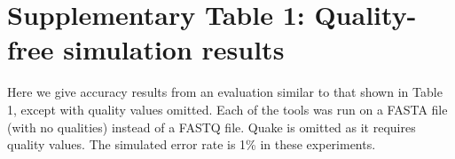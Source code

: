 \documentclass[10pt]{article}
\begin{document}




\section*{Supplementary Table 1: Quality-free simulation results}

Here we give accuracy results from an evaluation similar to that shown in Table 1, except with quality values omitted.  Each of the tools was run on a FASTA file (with no qualities) instead of a FASTQ file.  Quake is omitted as it requires quality values.  The simulated error rate is 1\% in these experiments.
\end{document}
